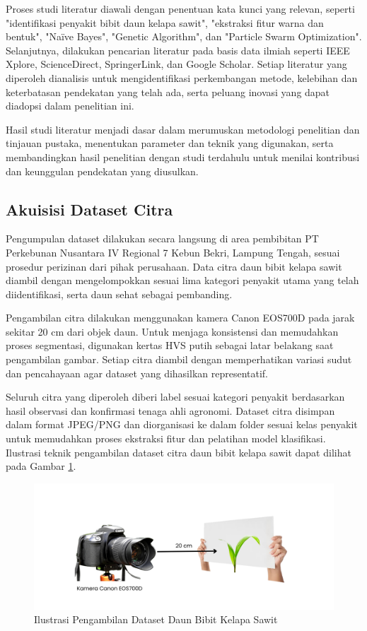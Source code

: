 Proses studi literatur diawali dengan penentuan kata kunci yang relevan, seperti "identifikasi penyakit bibit daun kelapa sawit", "ekstraksi fitur warna dan bentuk", "Naïve Bayes", "Genetic Algorithm", dan "Particle Swarm Optimization". Selanjutnya, dilakukan pencarian literatur pada basis data ilmiah seperti IEEE Xplore, ScienceDirect, SpringerLink, dan Google Scholar. Setiap literatur yang diperoleh dianalisis untuk mengidentifikasi perkembangan metode, kelebihan dan keterbatasan pendekatan yang telah ada, serta peluang inovasi yang dapat diadopsi dalam penelitian ini.

Hasil studi literatur menjadi dasar dalam merumuskan metodologi penelitian dan tinjauan pustaka, menentukan parameter dan teknik yang digunakan, serta membandingkan hasil penelitian dengan studi terdahulu untuk menilai kontribusi dan keunggulan pendekatan yang diusulkan.

\subsection{Akuisisi Dataset Citra} \label{III.Akuisisi Citra}
Pengumpulan dataset dilakukan secara langsung di area pembibitan PT Perkebunan Nusantara IV Regional 7 Kebun Bekri, Lampung Tengah, sesuai prosedur perizinan dari pihak perusahaan. Data citra daun bibit kelapa sawit diambil dengan mengelompokkan sesuai lima kategori penyakit utama yang telah diidentifikasi, serta daun sehat sebagai pembanding.

Pengambilan citra dilakukan menggunakan kamera Canon EOS700D pada jarak sekitar 20 cm dari objek daun. Untuk menjaga konsistensi dan memudahkan proses segmentasi, digunakan kertas HVS putih sebagai latar belakang saat pengambilan gambar. Setiap citra diambil dengan memperhatikan variasi sudut dan pencahayaan agar dataset yang dihasilkan representatif.

Seluruh citra yang diperoleh diberi label sesuai kategori penyakit berdasarkan hasil observasi dan konfirmasi tenaga ahli agronomi. Dataset citra disimpan dalam format JPEG/PNG dan diorganisasi ke dalam folder sesuai kelas penyakit untuk memudahkan proses ekstraksi fitur dan pelatihan model klasifikasi. Ilustrasi teknik pengambilan dataset citra daun bibit kelapa sawit dapat dilihat pada Gambar \ref{fig:3.Ilustrasi Akuisisi}.

\begin{figure}[H]
	\centering
	\includegraphics[width=1\textwidth]{figure/chapter-3-ilustrasi-akuisisi.png}
	\caption{Ilustrasi Pengambilan Dataset Daun Bibit Kelapa Sawit}
	\label{fig:3.Ilustrasi Akuisisi}
\end{figure}

